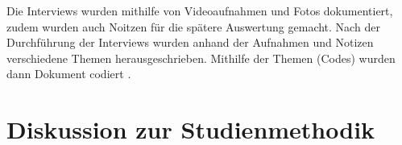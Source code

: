 \documentclass{hsflensburg}
\begin{document}
	Die Interviews wurden mithilfe von Videoaufnahmen und Fotos dokumentiert, zudem
	wurden auch Noitzen für die spätere Auswertung gemacht. Nach der Durchführung
	der Interviews wurden anhand der Aufnahmen und Notizen verschiedene Themen
	herausgeschrieben. Mithilfe der Themen (Codes) wurden dann Dokument codiert
	\cite{odom2011teenagers}.  

	\section{Diskussion zur Studienmethodik}

	\clearpage
	\nocite{*}	
	
	
\end{document}
